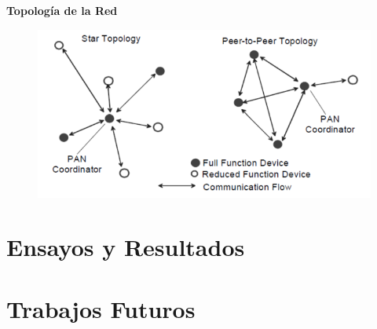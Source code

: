 \documentclass[aspectratio=43, handout]{beamer}
\begin{document}
\begin{frame}{\textbf{\LARGE{Topología de la Red}}}
		\begin{figure}[H]
			{\includegraphics[width=.9\textwidth]{./imagenes/Topology}}
		\end{figure}	  	  	
\end{frame}

\section{Ensayos y Resultados}


\section{Trabajos Futuros}
\end{document}
